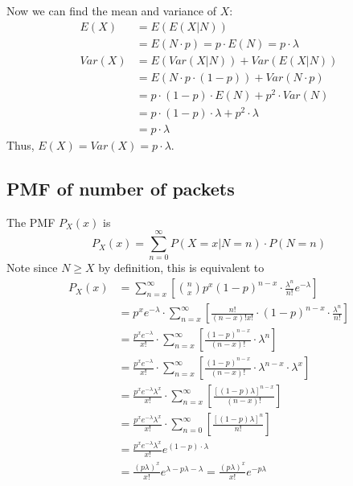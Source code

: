 \documentclass[paper=a4, fontsize=11pt]{scrartcl} %
\numberwithin{equation}{section} %
\numberwithin{figure}{section} %
\numberwithin{table}{section} %
\begin{document}
Now we can find the mean and variance of $X$:
\begin{align*}
E(X) &= E(E(X | N))\\
   &= E(N \cdot p) = p \cdot E(N) = p \cdot \lambda \\
Var(X) &= E(Var(X | N)) + Var(E(X | N))\\
   &= E(N \cdot p \cdot (1-p)) + Var(N \cdot p)\\
   &= p \cdot (1-p) \cdot E(N) + p^2 \cdot Var(N)\\
   &= p \cdot (1-p) \cdot  \lambda + p^2 \cdot \lambda\\
   &= p \cdot \lambda
\end{align*}
Thus, $E(X) = Var(X) = p \cdot  \lambda$. 

\subsection{PMF of number of packets}

The PMF $P_X(x)$ is
\begin{equation*}
P_X(x) = \sum_{n=0}^\infty P(X = x | N = n) \cdot P(N = n)
\end{equation*}
Note since $N \geq X$ by definition, this is equivalent to
\begin{align*}
P_X(x) &= \sum_{n=x}^\infty \left[{n \choose x} p^x (1-p)^{n-x} \cdot \frac{\lambda^n}{n!} e^{-\lambda}\right] \\ 
   &= p^x e^{-\lambda} \cdot \sum_{n=x}^\infty \left[ \frac{n!}{(n-x)!x!} \cdot (1-p)^{n-x} \cdot \frac{\lambda^n}{n!} \right] \\ 
   &= \frac{p^x e^{-\lambda}}{x!} \cdot \sum_{n=x}^\infty \left[ \frac{(1-p)^{n-x}}{(n-x)!} \cdot \lambda^n \right] \\ 
   &= \frac{p^x e^{-\lambda}}{x!} \cdot \sum_{n=x}^\infty \left[ \frac{(1-p)^{n-x}}{(n-x)!} \cdot \lambda^{n-x} \cdot \lambda^x \right] \\ 
   &= \frac{p^x e^{-\lambda} \lambda^x}{x!} \cdot \sum_{n=x}^\infty \left[ \frac{\left[(1-p) \lambda \right]^{n-x}}{(n-x)!} \right] \\ 
   &= \frac{p^x e^{-\lambda} \lambda^x}{x!} \cdot \sum_{n=0}^\infty \left[ \frac{\left[(1-p) \lambda \right]^{n}}{n!} \right] \\
   &= \frac{p^x e^{-\lambda} \lambda^x}{x!} e^{(1-p) \cdot \lambda}\\
   &= \frac{(p \lambda) ^x}{x!} e^{\lambda - p \lambda - \lambda} = \frac{(p \lambda) ^x}{x!} e^{- p \lambda}
\end{align*}
\end{document}
